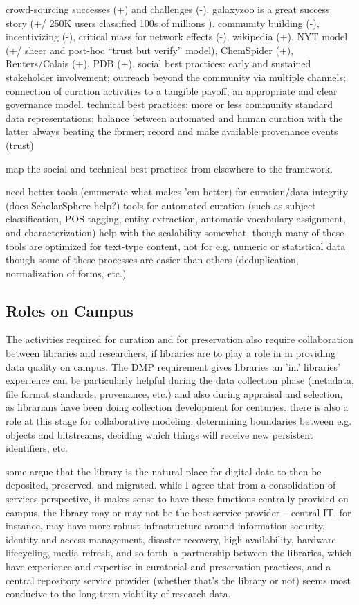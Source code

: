 \documentclass{acm_proc_article-sp}
\begin{document}
crowd-sourcing successes (+) and challenges (-). galaxyzoo is a great
success story (+/ 250K users classified 100s of millions
\cite{adams:galaxyzoo}). community building (-), incentivizing (-),
critical mass for network effects (-), wikipedia (+), NYT model (+/
sheer and post-hoc ``trust but verify'' model), ChemSpider (+),
Reuters/Calais (+), PDB (+).  social best
practices\cite{curry:community}: early and sustained stakeholder
involvement; outreach beyond the community via multiple channels;
connection of curation activities to a tangible payoff; an appropriate
and clear governance model. technical best practices: more or less
community standard data representations; balance between automated and
human curation with the latter always beating the former; record and
make available provenance events (trust)

map the social and technical best practices from elsewhere to the
framework.

need better tools (enumerate what makes 'em better) for curation/data
integrity (does ScholarSphere help?) tools for automated curation
(such as subject classification, POS tagging, entity extraction,
automatic vocabulary assignment, and characterization) help with the
scalability somewhat, though many of these tools are optimized for
text-type content, not for e.g. numeric or statistical data though
some of these processes are easier than others (deduplication,
normalization of forms, etc.)

\subsection{Roles on Campus}

The activities required for curation and for preservation also require
collaboration between libraries and researchers, if libraries are to
play a role in in providing data quality on campus. The DMP
requirement gives libraries an 'in.' libraries' experience can be
particularly helpful during the data collection phase (metadata, file
format standards, provenance, etc.) and also during appraisal and
selection, as librarians have been doing collection development for
centuries. there is also a role at this stage for collaborative
modeling: determining boundaries between e.g. objects and bitstreams,
deciding which things will receive new persistent identifiers, etc.

some \cite{heidorn:libraries} argue that the library is the natural
place for digital data to then be deposited, preserved, and
migrated. while I agree that from a consolidation of services
perspective, it makes sense to have these functions centrally provided
on campus, the library may or may not be the best service provider --
central IT, for instance, may have more robust infrastructure around
information security, identity and access management, disaster
recovery, high availability, hardware lifecycling, media refresh, and
so forth. a partnership between the libraries, which have experience
and expertise in curatorial and preservation practices, and a central
repository service provider (whether that's the library or not) seems
most conducive to the long-term viability of research data.
\end{document}
